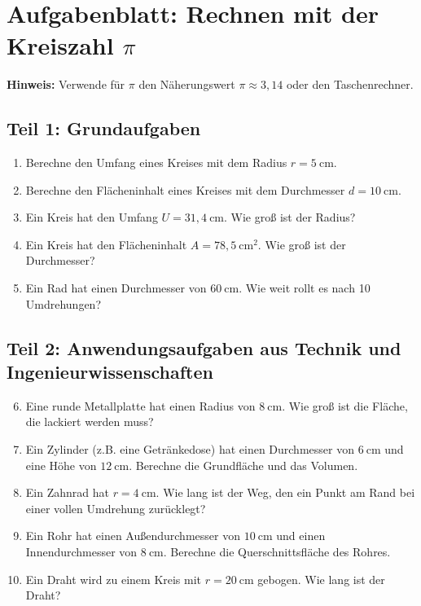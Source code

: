 

\section*{Aufgabenblatt: Rechnen mit der Kreiszahl $\pi$}

\textbf{Hinweis:} Verwende für $\pi$ den Näherungswert $\pi \approx 3{,}14$ oder den Taschenrechner.

\subsection*{Teil 1: Grundaufgaben}
\begin{enumerate}
    \item Berechne den Umfang eines Kreises mit dem Radius $r = 5~\text{cm}$.
    \item Berechne den Flächeninhalt eines Kreises mit dem Durchmesser $d = 10~\text{cm}$.
    \item Ein Kreis hat den Umfang $U = 31{,}4~\text{cm}$. Wie groß ist der Radius?
    \item Ein Kreis hat den Flächeninhalt $A = 78{,}5~\text{cm}^2$. Wie groß ist der Durchmesser?
    \item Ein Rad hat einen Durchmesser von $60~\text{cm}$. Wie weit rollt es nach 10 Umdrehungen?
\end{enumerate}

\subsection*{Teil 2: Anwendungsaufgaben aus Technik und Ingenieurwissenschaften}
\begin{enumerate}
    \setcounter{enumi}{5}
    \item Eine runde Metallplatte hat einen Radius von $8~\text{cm}$. Wie groß ist die Fläche, die lackiert werden muss?
    \item Ein Zylinder (z.B. eine Getränkedose) hat einen Durchmesser von $6~\text{cm}$ und eine Höhe von $12~\text{cm}$. Berechne die Grundfläche und das Volumen.
    \item Ein Zahnrad hat $r = 4~\text{cm}$. Wie lang ist der Weg, den ein Punkt am Rand bei einer vollen Umdrehung zurücklegt?
    \item Ein Rohr hat einen Außendurchmesser von $10~\text{cm}$ und einen Innendurchmesser von $8~\text{cm}$. Berechne die Querschnittsfläche des Rohres.
    \item Ein Draht wird zu einem Kreis mit $r = 20~\text{cm}$ gebogen. Wie lang ist der Draht?
\end{enumerate}

